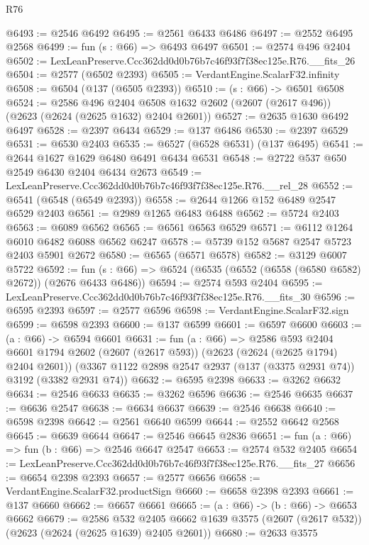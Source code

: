 \begin{lexlean}{R76}
\begin{coremodule}
@6493 := @2546 @6492
@6495 := @2561 @6433 @6486
@6497 := @2552 @6495 @2568
@6499 := fun (s : @66) => @6493 @6497
@6501 := @2574 @496 @2404
@6502 := LexLeanPreserve.Ccc362dd0d0b76b7c46f93f7f38ec125e.R76.__fits_26
@6504 := @2577 (@6502 @2393)
@6505 := VerdantEngine.ScalarF32.infinity
@6508 := @6504 (@137 (@6505 @2393))
@6510 := (s : @66) -> @6501 @6508
@6524 := @2586
    @496
    @2404
    @6508
    @1632
    @2602
    (@2607 (@2617 @496))
    (@2623 (@2624 (@2625 @1632) @2404 @2601))
@6527 := @2635 @1630 @6492 @6497
@6528 := @2397 @6434
@6529 := @137 @6486
@6530 := @2397 @6529
@6531 := @6530 @2403
@6535 := @6527 (@6528 @6531) (@137 @6495)
@6541 := @2644 @1627 @1629 @6480 @6491 @6434 @6531
@6548 := @2722 @537 @650 @2549 @6430 @2404 @6434 @2673
@6549 := LexLeanPreserve.Ccc362dd0d0b76b7c46f93f7f38ec125e.R76.__rel_28
@6552 := @6541 (@6548 (@6549 @2393))
@6558 := @2644 @1266 @152 @6489 @2547 @6529 @2403
@6561 := @2989 @1265 @6483 @6488
@6562 := @5724 @2403
@6563 := @6089 @6562
@6565 := @6561 @6563 @6529
@6571 := @6112 @1264 @6010 @6482 @6088 @6562 @6247
@6578 := @5739 @152 @5687 @2547 @5723 @2403 @5901 @2672
@6580 := @6565 (@6571 @6578)
@6582 := @3129 @6007 @5722
@6592 := fun (s : @66) => @6524 (@6535 (@6552 (@6558 (@6580 @6582) @2672)) (@2676 @6433 @6486))
@6594 := @2574 @593 @2404
@6595 := LexLeanPreserve.Ccc362dd0d0b76b7c46f93f7f38ec125e.R76.__fits_30
@6596 := @6595 @2393
@6597 := @2577 @6596
@6598 := VerdantEngine.ScalarF32.sign
@6599 := @6598 @2393
@6600 := @137 @6599
@6601 := @6597 @6600
@6603 := (a : @66) -> @6594 @6601
@6631 := fun (a : @66) =>
  @2586
    @593
    @2404
    @6601
    @1794
    @2602
    (@2607 (@2617 @593))
    (@2623 (@2624 (@2625 @1794) @2404 @2601))
    (@3367 @1122 @2898 @2547 @2937 (@137 (@3375 @2931 @74)) @3192 (@3382 @2931 @74))
@6632 := @6595 @2398
@6633 := @3262 @6632
@6634 := @2546 @6633
@6635 := @3262 @6596
@6636 := @2546 @6635
@6637 := @6636 @2547
@6638 := @6634 @6637
@6639 := @2546 @6638
@6640 := @6598 @2398
@6642 := @2561 @6640 @6599
@6644 := @2552 @6642 @2568
@6645 := @6639 @6644
@6647 := @2546 @6645 @2836
@6651 := fun (a : @66) => fun (b : @66) => @2546 @6647 @2547
@6653 := @2574 @532 @2405
@6654 := LexLeanPreserve.Ccc362dd0d0b76b7c46f93f7f38ec125e.R76.__fits_27
@6656 := @6654 @2398 @2393
@6657 := @2577 @6656
@6658 := VerdantEngine.ScalarF32.productSign
@6660 := @6658 @2398 @2393
@6661 := @137 @6660
@6662 := @6657 @6661
@6665 := (a : @66) -> (b : @66) -> @6653 @6662
@6679 := @2586
    @532
    @2405
    @6662
    @1639
    @3575
    (@2607 (@2617 @532))
    (@2623 (@2624 (@2625 @1639) @2405 @2601))
@6680 := @2633 @3575

\end{coremodule}
\end{lexlean}

